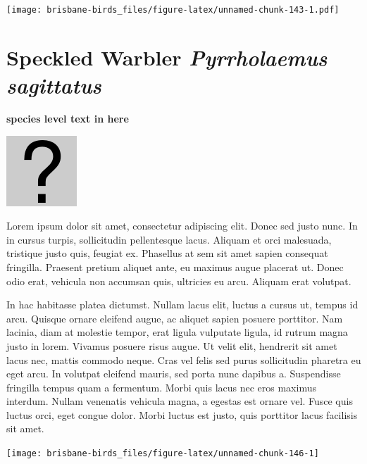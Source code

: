 \documentclass[]{book}
\let\origfigure\figure
\let\endorigfigure\endfigure
\renewenvironment{figure}[1][2] {
  \expandafter\origfigure\expandafter[H]
} {
  \endorigfigure
}
\begin{document}
\begin{figure}
\centering
\texttt{[image: brisbane-birds\_files/figure-latex/unnamed-chunk-143-1.pdf]}
\caption{\label{fig:unnamed-chunk-143}insert figure caption}
\end{figure}

\section{\texorpdfstring{Speckled Warbler \emph{Pyrrholaemus
sagittatus}}{Speckled Warbler Pyrrholaemus sagittatus}}\label{speckled-warbler-pyrrholaemus-sagittatus}

\textbf{species level text in here}

\begin{figure}
\centering
\includegraphics{assets/missing.png}
\caption{No image for species}
\end{figure}

Lorem ipsum dolor sit amet, consectetur adipiscing elit. Donec sed justo
nunc. In in cursus turpis, sollicitudin pellentesque lacus. Aliquam et
orci malesuada, tristique justo quis, feugiat ex. Phasellus at sem sit
amet sapien consequat fringilla. Praesent pretium aliquet ante, eu
maximus augue placerat ut. Donec odio erat, vehicula non accumsan quis,
ultricies eu arcu. Aliquam erat volutpat.

In hac habitasse platea dictumst. Nullam lacus elit, luctus a cursus ut,
tempus id arcu. Quisque ornare eleifend augue, ac aliquet sapien posuere
porttitor. Nam lacinia, diam at molestie tempor, erat ligula vulputate
ligula, id rutrum magna justo in lorem. Vivamus posuere risus augue. Ut
velit elit, hendrerit sit amet lacus nec, mattis commodo neque. Cras vel
felis sed purus sollicitudin pharetra eu eget arcu. In volutpat eleifend
mauris, sed porta nunc dapibus a. Suspendisse fringilla tempus quam a
fermentum. Morbi quis lacus nec eros maximus interdum. Nullam venenatis
vehicula magna, a egestas est ornare vel. Fusce quis luctus orci, eget
congue dolor. Morbi luctus est justo, quis porttitor lacus facilisis sit
amet.

\begin{figure}
\texttt{[image: brisbane-birds\_files/figure-latex/unnamed-chunk-146-1]} \caption{insert figure caption}\label{fig:unnamed-chunk-146}
\end{figure}
\end{document}
